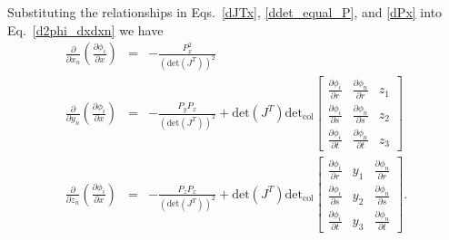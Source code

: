 Substituting the relationships in Eqs.\ \eqref{dJTx}, \eqref{ddet_equal_P}, and \eqref{dPx} into Eq.\ \eqref{d2phi_dxdxn} we have
%
\begin{eqnarray}
\frac{\partial}{\partial x_n} \left( \frac{\partial \phi_i}{\partial x} \right) &=&  -\frac{P_x^2}{(\text{det}(J^T))^2}  \nonumber\\
\frac{\partial}{\partial y_n} \left( \frac{\partial \phi_i}{\partial x} \right) &=& -\frac{P_y P_x}{(\text{det}(J^T))^2} + \text{det}(J^T) \text{det}_{\text{col}} \begin{bmatrix}
\frac{\partial \phi_i}{\partial r} & \frac{\partial \phi_n}{\partial r} & z_1 \\
\frac{\partial \phi_i}{\partial s} & \frac{\partial \phi_n}{\partial s} & z_2 \\
\frac{\partial \phi_i}{\partial t} & \frac{\partial \phi_n}{\partial t} & z_3 
\end{bmatrix} \nonumber\\
\frac{\partial}{\partial z_n} \left( \frac{\partial \phi_i}{\partial x} \right) &=& -\frac{P_z P_x}{(\text{det}(J^T))^2} + \text{det}(J^T) \text{det}_{\text{col}} \begin{bmatrix}
\frac{\partial \phi_i}{\partial r} & y_1 & \frac{\partial \phi_n}{\partial r}  \\
\frac{\partial \phi_i}{\partial s} & y_2 & \frac{\partial \phi_n}{\partial s} \\
\frac{\partial \phi_i}{\partial t} & y_3 & \frac{\partial \phi_n}{\partial t}  
\end{bmatrix} .
\label{dkdx}
\end{eqnarray}
%

